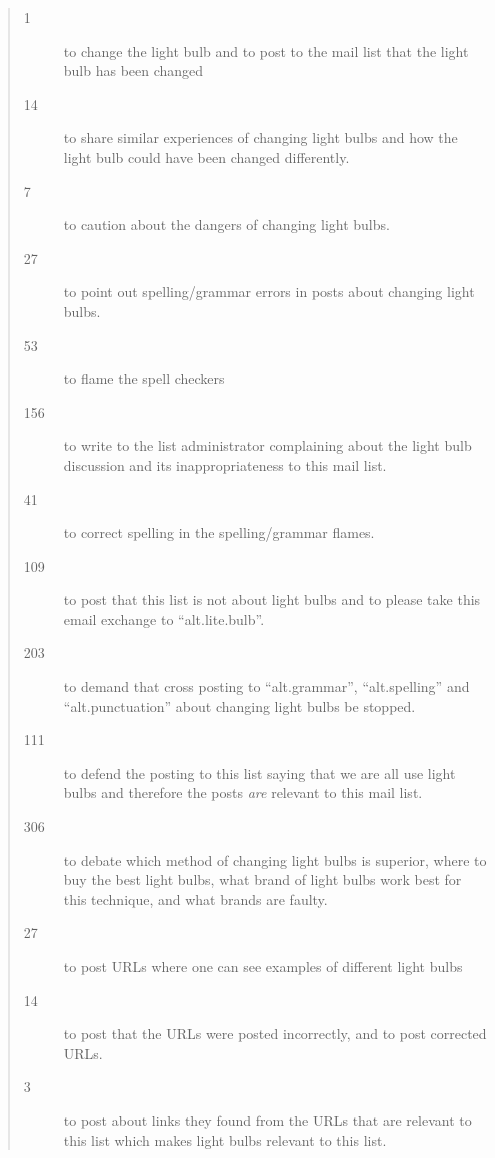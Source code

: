 \documentclass[a4paper]{report}
\begin{document}
\begin{appendix}
\begin{quotation}
\begin{description}

\item[1] to change the light bulb and to post to the mail list that
the light bulb has been changed

\item[14] to share similar experiences of changing light bulbs and how
the light bulb could have been changed differently.

\item[7] to caution about the dangers of changing light bulbs.

\item[27] to point out spelling/grammar errors in posts about changing
light bulbs.

\item[53] to flame the spell checkers

\item[156] to write to the list administrator complaining about the
light bulb discussion and its inappropriateness to this mail list.

\item[41] to correct spelling in the spelling/grammar flames.

\item[109] to post that this list is not about light bulbs and to
please take this email exchange to ``alt.lite.bulb''.

\item[203] to demand that cross posting to ``alt.grammar'',
``alt.spelling'' and ``alt.punctuation'' about changing light bulbs be
stopped.

\item[111] to defend the posting to this list saying that we are all
use light bulbs and therefore the posts \emph{are} relevant to
this mail list.

\item[306] to debate which method of changing light bulbs is superior,
where to buy the best light bulbs, what brand of light bulbs work best
for this technique, and what brands are faulty.

\item[27] to post URLs where one can see examples of different light
bulbs

\item[14] to post that the URLs were posted incorrectly, and to post
corrected URLs.

\item[3] to post about links they found from the URLs that are
relevant to this list which makes light bulbs relevant to this list.


\end{description}
\end{quotation}
\end{appendix}
\end{document}
